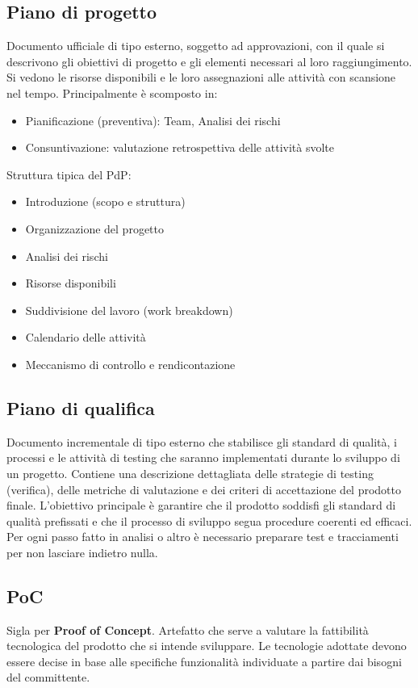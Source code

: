 \documentclass[a4paper,12pt]{article}
\begin{document}
\subsection*{Piano di progetto}
Documento ufficiale di tipo esterno, soggetto ad approvazioni, con il quale si descrivono gli obiettivi di progetto e gli elementi necessari al loro raggiungimento.  
Si vedono le risorse disponibili e le loro assegnazioni alle attività con scansione nel tempo.  
Principalmente è scomposto in:
\begin{itemize}
\item Pianificazione (preventiva): Team, Analisi dei rischi
\item Consuntivazione: valutazione retrospettiva delle attività svolte
\end{itemize}
Struttura tipica del PdP:
\begin{itemize}
\item Introduzione (scopo e struttura)
\item Organizzazione del progetto
\item Analisi dei rischi
\item Risorse disponibili
\item Suddivisione del lavoro (work breakdown)
\item Calendario delle attività
\item Meccanismo di controllo e rendicontazione
\end{itemize}

\subsection{Piano di qualifica}
Documento incrementale di tipo esterno che stabilisce gli standard di qualità, i processi e le attività di testing che saranno implementati durante lo sviluppo di un progetto.  
Contiene una descrizione dettagliata delle strategie di testing (verifica), delle metriche di valutazione e dei criteri di accettazione del prodotto finale.  
L’obiettivo principale è garantire che il prodotto soddisfi gli standard di qualità prefissati e che il processo di sviluppo segua procedure coerenti ed efficaci.  
Per ogni passo fatto in analisi o altro è necessario preparare test e tracciamenti per non lasciare indietro nulla.

\subsection*{PoC}
Sigla per \textbf{Proof of Concept}. Artefatto che serve a valutare la fattibilità tecnologica del prodotto che si intende sviluppare. Le tecnologie adottate devono essere decise in base alle specifiche funzionalità individuate a partire dai bisogni del committente.
\end{document}
